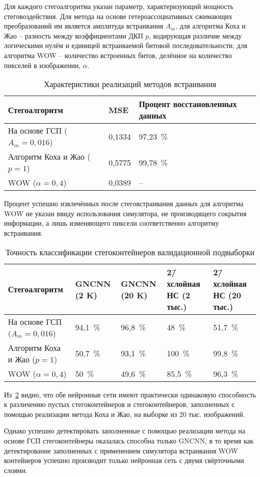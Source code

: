 Для каждого стегоалгоритма указан параметр, характеризующий мощность стеговоздействия. Для метода на основе гетероассоциативных сжимающих преобразований им является амплитуда встраивания $ A_m $, для алгоритма Коха и Жао – разность между коэффициентами ДКП $ p $, кодирующая различие между логическими нулём и единицей встраиваемой битовой последовательности, для алгоритма WOW – количество встроенных битов, делённое на количество пикселей в изображении, $ \alpha $.

\begin{table}[h!]
\centering
    \begin{tabular}{| l | l | l |}
    \hline
    Стегоалгоритм & MSE & Процент восстановленных данных \\ \hline
    На основе ГСП ($ A_m = 0,016 $) & 0,1334 & 97,23~\% \\ \hline
    Алгоритм Коха и Жао ($ p = 1 $) & 0,5775 & 99,78~\% \\ \hline
    WOW ($ \alpha = 0,4 $) & 0,0389 & – \\ \hline
    \end{tabular}
\caption{Характеристики реализаций методов встраивания}
\label{table:1}
\end{table}

Процент успешно извлечённых после стеговстраивания данных для алгоритма WOW не указан ввиду использования симулятора, не производящего сокрытия информации, а лишь изменяющего пиксели соответственно алгоритму встраивания.

\begin{table}[h!]
\centering
    \begin{tabular}{| l | p{2cm} | p{2cm} | p{2cm} | p{2cm} |}
    \hline
    Стегоалгоритм & GNCNN (2 K) & GNCNN (20 K) & 2\=/хслойная НС (2 тыс.) & 2\=/хслойная НС (20 тыс.) \\ \hline
    На основе ГСП ($ A_m = 0,016 $) & 94,1~\% & 96,8~\% & 48~\% & 51,7~\% \\ \hline
    Алгоритм Коха и Жао ($ p = 1 $) & 50,7~\% & 93,1~\% & 100~\% & 99,8~\% \\ \hline
    WOW ($ \alpha = 0,4 $) & 50~\% & 49,6~\% & 85,5~\% & 96,3~\% \\ \hline
    \end{tabular}
\caption{Точность классификации стегоконтейнеров валидационной подвыборки}
\label{table:2}
\end{table}

Из~\ref{table:2} видно, что обе нейронные сети имеют практически одинаковую способность к различению пустых стегоконтейнеров и стегоконтейнеров, заполненных с помощью реализации метода Коха и Жао, на выборке из 20 тыс. изображений.

Однако успешно детектировать заполненные с помощью реализации метода на основе ГСП стегоконтейнеры оказалась способна только GNCNN, в то время как детектирование заполненных с применением симулятора встраивания WOW контейнеров успешно производит только нейронная сеть с двумя свёрточными слоями.

\clearpage

